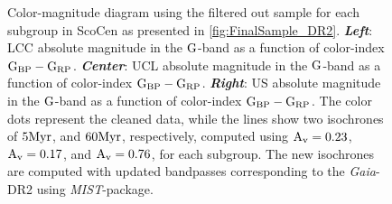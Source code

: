 \begin{figure}[!ht]
\centering
\caption{\scriptsize{Color-magnitude diagram using the filtered out sample for each subgroup in ScoCen as presented in \autoref{fig:FinalSample_DR2}. \textit{\textbf{Left}}: LCC absolute magnitude in the $\textnormal{G}$-band as a function of color-index $\textnormal{G}_\textnormal{BP} - \textnormal{G}_\textnormal{RP}$. \textit{\textbf{Center}}: UCL absolute magnitude in the $\textnormal{G}$-band as a function of color-index $\textnormal{G}_\textnormal{BP} - \textnormal{G}_\textnormal{RP}$. \textit{\textbf{Right}}: US absolute magnitude in the $\textnormal{G}$-band as a function of color-index $\textnormal{G}_\textnormal{BP} - \textnormal{G}_\textnormal{RP}$. The color dots represent the cleaned data, while the lines show two isochrones of $5 \textnormal{Myr}$, and $60 \textnormal{Myr}$, respectively, computed using $\textnormal{A}_\textnormal{v} = 0.23$, $\textnormal{A}_\textnormal{v} = 0.17$, and $\textnormal{A}_\textnormal{v} = 0.76$, for each subgroup. The new isochrones are computed with updated bandpasses corresponding to the \textit{Gaia}-DR2 using \textit{MIST}-package.}}
\label{fig:DR2_Comparison}
\end{figure}

